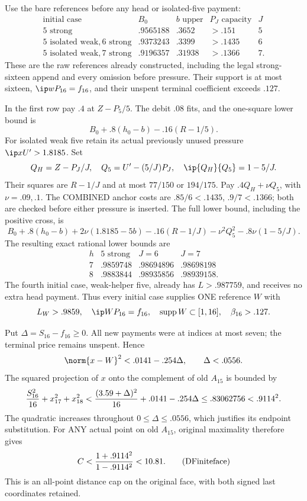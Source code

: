 Use the bare references before any head or isolated-five payment:
\[
\begin{array}{c|c|c|c|c}
\text{initial case}&B_0&b\text{ upper}&P_J\text{ capacity}&J\\ \hline
5\text{ strong}&.9565188&.3652&>.151&5\\
5\text{ isolated weak},6\text{ strong}&.9373243&.3399&>.1435&6\\
5\text{ isolated weak},7\text{ strong}&.9196357&.31938&>.1366&7 .
\end{array}
\]
These are the raw references already constructed, including the
legal strong-sixteen append and every omission before pressure.
Their support is at most sixteen,
\(\ip w{P_{16}}=f_{16}\), and their unspent terminal coefficient
exceeds \(.127\).

In the first row pay \(.4\) at \(Z-P_5/5\).
The debit \(.08\) fits, and the one-square lower bound is
\[
 B_0+.8(h_0-b)-.16(R-1/5).
\]
For isolated weak five retain its actual previously unused pressure
\(\ip x{U'}>1.8185\).
Set
\[
 Q_H=Z-P_J/J,\quad Q_5=U'-(5/J)P_J,\quad
 \ip{Q_H}{Q_5}=1-5/J .
\]
Their squares are \(R-1/J\) and at most
\(77/150\) or \(194/175\).
Pay \(.4Q_H+\nu Q_5\), with \(\nu=.09,.1\).
The COMBINED anchor costs are
\(.85/6<.1435\), \(.9/7<.1366\);
both are checked before either pressure is inserted.
The full lower bound, including the positive cross, is
\[
 B_0+.8(h_0-b)+2\nu(1.8185-5b)
 -.16(R-1/J)-\nu^2Q_5^2-.8\nu(1-5/J).
\]
The resulting exact rational lower bounds are
\[
 \begin{array}{c|ccc}
 h&5\text{ strong}&J=6&J=7\\ \hline
 7&.9859748&.98694896&.98698198\\
 8&.9883844&.98935856&.98939158 .
 \end{array}
\]
The fourth initial case, weak-helper five, already has
\(L>.987759\), and receives no extra head payment.
Thus every initial case supplies ONE reference \(W\) with
\[
 L_W>.9859,\quad
 \ip W{P_{16}}=f_{16},\quad
 \operatorname{supp}W\subset[1,16],\quad \beta_{16}>.127.
\]

Put \(\Delta=S_{16}-f_{16}\ge0\).
All new payments were at indices at most seven; the terminal
price remains unspent.  Hence
\[
 \norm{x-W}^2<.0141-.254\Delta,\qquad
 \Delta<.0556 .
\]
The squared projection of \(x\) onto the complement of old \(A_{15}\)
is bounded by
\[
 {S_{16}^2\over16}+x_{17}^2+x_{18}^2
 <{(3.59+\Delta)^2\over16}+.0141-.254\Delta
 \le .83062756<.9114^2 .
\]
The quadratic increases throughout \(0\le\Delta\le.0556\),
which justifies its endpoint substitution.
For ANY actual point on old \(A_{15}\), original maximality
therefore gives
\[
              C<{1+.9114^2\over1-.9114^2}<10.81 .
\tag{DFiniteface}\label{eq:DFiniteface}
\]
This is an all-point distance cap on the original face, with both
signed last coordinates retained.

